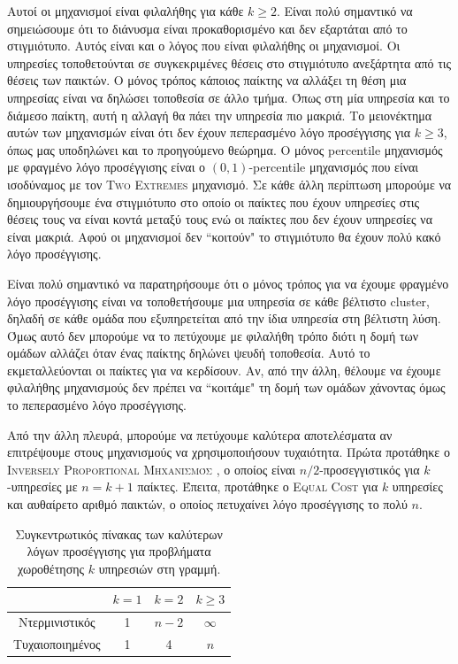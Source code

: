 Αυτοί οι μηχανισμοί είναι φιλαλήθης για κάθε $k\ge2$. Είναι πολύ σημαντικό να σημειώσουμε ότι το διάνυσμα είναι προκαθορισμένο και δεν εξαρτάται από το στιγμιότυπο. Αυτός είναι και ο λόγος που είναι φιλαλήθης οι μηχανισμοί. Οι υπηρεσίες τοποθετούνται σε συγκεκριμένες θέσεις στο στιγμιότυπο ανεξάρτητα από τις θέσεις των παικτών. Ο μόνος τρόπος κάποιος παίκτης να αλλάξει τη θέση μια υπηρεσίας είναι να δηλώσει τοποθεσία σε άλλο τμήμα. Όπως στη μία υπηρεσία και το διάμεσο παίκτη, αυτή η αλλαγή θα πάει την υπηρεσία πιο μακριά. Το μειονέκτημα αυτών των μηχανισμών είναι ότι δεν έχουν πεπερασμένο λόγο προσέγγισης για $k\ge3$, όπως μας υποδηλώνει και το προηγούμενο θεώρημα. Ο μόνος percentile μηχανισμός με φραγμένο λόγο προσέγγισης είναι ο $(0,1)$-percentile μηχανισμός που είναι ισοδύναμος με τον \textsc{Two Extremes} μηχανισμό. Σε κάθε άλλη περίπτωση μπορούμε να δημιουργήσουμε ένα στιγμιότυπο στο οποίο οι παίκτες που έχουν υπηρεσίες στις θέσεις τους να είναι κοντά μεταξύ τους ενώ οι παίκτες που δεν έχουν υπηρεσίες να είναι μακριά. Αφού οι μηχανισμοί δεν ``κοιτούν" το στιγμιότυπο θα έχουν πολύ κακό λόγο προσέγγισης.

Είναι πολύ σημαντικό να παρατηρήσουμε ότι ο μόνος τρόπος για να έχουμε φραγμένο λόγο προσέγγισης είναι να τοποθετήσουμε μια υπηρεσία σε κάθε βέλτιστο cluster, δηλαδή σε κάθε ομάδα που εξυπηρετείται από την ίδια υπηρεσία στη βέλτιστη λύση. Όμως αυτό δεν μπορούμε να το πετύχουμε με φιλαλήθη τρόπο διότι η δομή των ομάδων αλλάζει όταν ένας παίκτης δηλώνει ψευδή τοποθεσία. Αυτό το εκμεταλλεύονται οι παίκτες για να κερδίσουν. Αν, από την άλλη, θέλουμε να έχουμε φιλαλήθης μηχανισμούς δεν πρέπει να ``κοιτάμε" τη δομή των ομάδων χάνοντας όμως το πεπερασμένο λόγο προσέγγισης. 

Από την άλλη πλευρά, μπορούμε να πετύχουμε καλύτερα αποτελέσματα αν επιτρέψουμε στους μηχανισμούς να χρησιμοποιήσουν τυχαιότητα. Πρώτα προτάθηκε ο  \textsc{Inversely Proportional Μηχανισμός} \cite{escoffier2011}, ο οποίος είναι $n/2$-προσεγγιστικός για $k$-υπηρεσίες με $n=k+1$ παίκτες. Έπειτα, προτάθηκε ο \textsc{Equal Cost} \cite{Fotakis2013sp} για $k$ υπηρεσίες και αυθαίρετο αριθμό παικτών, ο οποίος πετυχαίνει λόγο προσέγγισης το πολύ $n$. 


\begin{table}[ht]
    \centering
    \begin{tabular}{|c|c|c|c|}
         \hline
         & $k=1$ & $k=2$ & $k\ge3$ \\ \hline 
        Ντερμινιστικός & 1\cite{Moulin1980} & $n-2$ \cite{Procaccia2013} & $\infty$ \cite{Fotakis2013}\\ \hline
        Τυχαιοποιημένος & 1\cite{Moulin1980} & 4 \cite{Lu2010} & $n$ \cite{Fotakis2013sp} \\ \hline
    \end{tabular}
    \caption{Συγκεντρωτικός πίνακας των καλύτερων λόγων προσέγγισης για προβλήματα χωροθέτησης $k$ υπηρεσιών στη γραμμή.}
    \label{tab:summaryLineGr}
\end{table}


